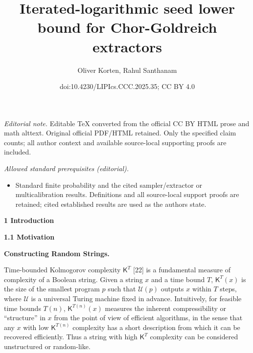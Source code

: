 \documentclass[10pt,a4paper]{article}
\title{Iterated-logarithmic seed lower bound for Chor-Goldreich extractors}
\author{Oliver Korten, Rahul Santhanam}
\date{doi:10.4230/LIPIcs.CCC.2025.35; CC BY 4.0}
\begin{document}
\maketitle
\noindent\textit{Editorial note.} Editable TeX converted from the official CC BY HTML prose and math alttext. Original official PDF/HTML retained. Only the specified claim counts; all author context and available source-local supporting proofs are included.\par\medskip
\noindent\textit{Allowed standard prerequisites (editorial).}\begin{itemize}
\item Standard finite probability and the cited sampler/extractor or multicalibration results. Definitions and all source-local support proofs are retained; cited established results are used as the authors state.
\end{itemize}\medskip


\par\medskip\noindent\textbf{
1 Introduction}\par




\par\medskip\noindent\textbf{
1.1 Motivation}\par




\par\medskip\noindent\textbf{Constructing Random Strings.}\par




Time-bounded Kolmogorov complexity ${\mathsf{K}}^{T}$ [22] is a fundamental measure of complexity of a Boolean string. Given a string $x$ and a time bound $T$, ${\mathsf{K}}^{T}(x)$ is the size of the smallest program $p$ such that $\mathcal{U}(p)$ outputs $x$ within $T$ steps, where $\mathcal{U}$ is a universal Turing machine fixed in advance. Intuitively, for feasible time bounds $T(n)$, ${\mathsf{K}}^{T(n)}(x)$ measures the inherent compressibility or “structure” in $x$ from the point of view of efficient algorithms, in the sense that any $x$ with low ${\mathsf{K}}^{T(n)}$ complexity has a short description from which it can be recovered efficiently. Thus a string with high ${\mathsf{K}}^{T}$ complexity can be considered unstructured or random-like.\par
\end{document}
